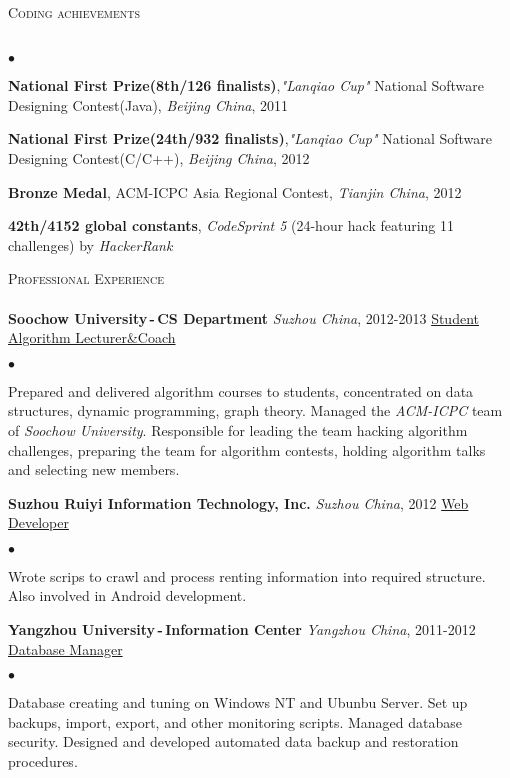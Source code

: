 \documentclass[11pt]{article}
\newcommand{\place}{\emph}
\newcommand{\specialname}{\textit}
\newcommand{\honor}{\textbf}
\newcommand{\lineunder}{\vspace*{-8pt} \\ \hspace*{-18pt} \hrulefill \\}
\newcommand{\header}[2]{{\hspace*{-15pt}\vspace*{6pt} \textsc{\large #1}\hfill{\footnotesize #2}} \vspace*{-6pt} \lineunder}
\newcommand{\employer}[4]{{ \textbf{#1} \emph{#2}, #3 \hfill \underline{#4}\\ }}
\newenvironment{achievements}{\begin{list}{$\bullet$}{\topsep 0pt \itemsep -2pt}}{\vspace*{2pt}\end{list}}
\begin{document}
\header{Coding achievements}{}
\begin{achievements} \begin{footnotesize}
    \item \honor{National First Prize(8th/126 finalists)},\specialname{"Lanqiao Cup"} National Software Designing Contest(Java), \place{Beijing China}, 2011
    \item \honor{National First Prize(24th/932 finalists)},\specialname{"Lanqiao Cup"} National Software Designing Contest(C/C++), \place{Beijing China}, 2012
    \item \honor{Bronze Medal}, ACM-ICPC Asia Regional Contest, \place{Tianjin China}, 2012
    \item \honor{42th/4152 global constants}, \emph{CodeSprint 5} (24-hour hack featuring 11 challenges) by \emph{HackerRank}
\end{footnotesize} \end{achievements}

\header{Professional Experience}{}

\employer{Soochow University\,-\,CS Department}{Suzhou China}{2012-2013} {Student Algorithm Lecturer\&Coach}
	\begin{achievements}
    \item Prepared and delivered algorithm courses to students, concentrated on
        data structures, dynamic programming, graph theory. Managed the \emph{ACM-ICPC} team of \emph{Soochow University}. Responsible for leading the team hacking algorithm
        challenges, preparing the team for algorithm contests, holding algorithm talks and selecting new members.
	\end{achievements}

\employer{Suzhou Ruiyi Information Technology, Inc.}{Suzhou China}{2012}{Web Developer}
	\begin{achievements}
        \item Wrote scrips to crawl and process renting information into required structure. Also involved in Android development.
	\end{achievements}

\employer{Yangzhou University\,-\,Information Center}{Yangzhou China}{2011-2012}{Database Manager}
	\begin{achievements}
    \item Database creating and tuning on Windows NT and Ubunbu Server. Set up backups, import, export, and other monitoring scripts.  Managed database security. Designed and developed automated data backup and restoration procedures.

	\end{achievements}
\end{document}
